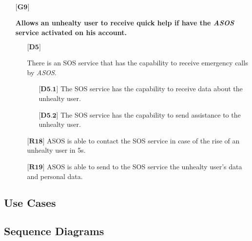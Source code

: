 \begin{itemize}
	\item[${\textbf{[G9]}}$] {\textbf{Allows an unhealty user to receive quick help if have the \hbox{\emph{ASOS}} service activated on his account.}
		\begin{itemize}
			\item[$\textbf{[D5]}$] {There is an SOS service that has the capability to receive emergency calls by \hbox{\emph{ASOS}}.
				\begin{itemize}
					\item[$\textbf{[D5.1]}$] {The SOS service has the capability to receive data about the unhealty user.}
					\item[$\textbf{[D5.2]}$] {The SOS service has the capability to send assistance to the unhealty user.}
				\end{itemize}}
			\item[$\textbf{[R18]}$] {ASOS is able to contact the SOS service in case of the rise of an unhealty user in 5s.}
			\item[$\textbf{[R19]}$] {ASOS is able to send to the SOS service the unhealty user's data and personal data.}
		\end{itemize}}
\end{itemize}

\subsection{Use Cases}

\subsection{Sequence Diagrams}
